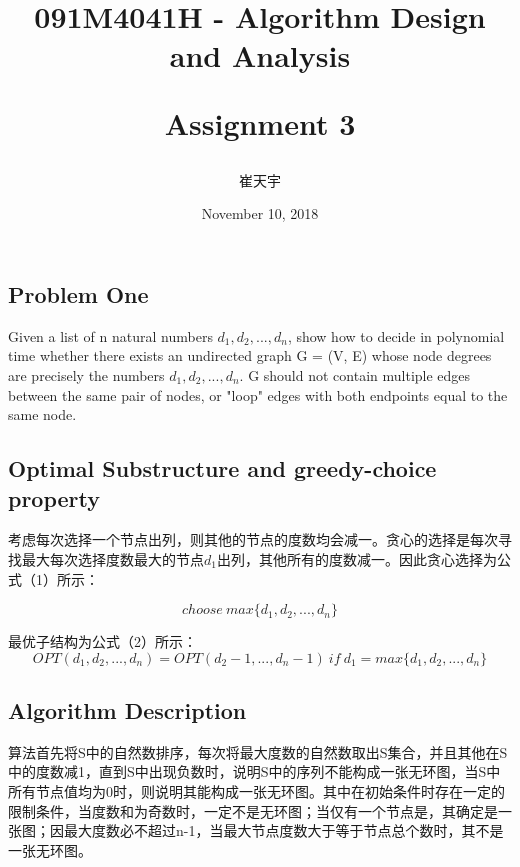 \documentclass{article}
\begin{document}
\begin{CJK*}{UTF8}{gbsn}

\title{091M4041H - Algorithm Design and Analysis\\ [2ex] \begin{large} Assignment 3 \end{large}}
\author{崔天宇}
\date{November 10, 2018}

\maketitle

\tableofcontents

\newpage
\section{Problem One}
Given a list of n natural numbers $d_1, d_2,...,d_n$, show how to decide in polynomial time whether there exists an undirected graph G = (V, E) whose node degrees are precisely the numbers $d_1, d_2,..., d_n$. G should not contain multiple edges between the same pair of nodes, or "loop" edges with both endpoints equal to the same node.

\subsection{Optimal Substructure and greedy-choice property}
考虑每次选择一个节点出列，则其他的节点的度数均会减一。贪心的选择是每次寻找最大每次选择度数最大的节点$d_1$出列，其他所有的度数减一。因此贪心选择为公式（1）所示：

\begin{equation}
choose\ max\{d_1,d_2,...,d_n\} 
\end{equation} 

最优子结构为公式（2）所示：
\begin{equation}
OPT(d_1,d_2,...,d_n) = OPT(d_2-1,...,d_n-1)\ if\ d_1 = max\{d_1,d_2,...,d_n\}
\end{equation} 

\subsection{Algorithm Description}
算法首先将S中的自然数排序，每次将最大度数的自然数取出S集合，并且其他在S中的度数减1，直到S中出现负数时，说明S中的序列不能构成一张无环图，当S中所有节点值均为0时，则说明其能构成一张无环图。其中在初始条件时存在一定的限制条件，当度数和为奇数时，一定不是无环图；当仅有一个节点是，其确定是一张图；因最大度数必不超过n-1，当最大节点度数大于等于节点总个数时，其不是一张无环图。


\end{CJK*}
\end{document}
